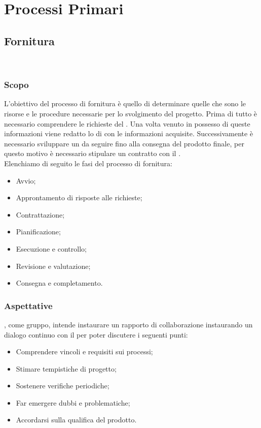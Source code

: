 \section{Processi Primari}
\subsection{Fornitura}\
\subsubsection{Scopo}
L'obiettivo del processo di fornitura è quello di determinare quelle che sono le risorse e le procedure necessarie per lo svolgimento del progetto. 
Prima di tutto è necessario comprendere le richieste del \proponProg{}. Una volta venuto in possesso di queste informazioni viene redatto lo  di \SdFv{} con le informazioni acquisite.
Successivamente è necessario sviluppare un \PdPv{} da seguire fino alla consegna del prodotto finale, per questo motivo è necessario stipulare un contratto con il \proponProg{}.\\
Elenchiamo di seguito le fasi del processo di fornitura:
\begin{itemize}
    \item{Avvio;}
    \item{Approntamento di risposte alle richieste;}
    \item{Contrattazione;}
    \item{Pianificazione;}
    \item{Esecuzione e controllo;}
    \item{Revisione e valutazione;}
    \item{Consegna e completamento.}
\end{itemize}

\subsubsection{Aspettative}
\Omicron, come gruppo, intende instaurare un rapporto di collaborazione instaurando un dialogo continuo con il \proponProg{} per poter discutere i seguenti punti:\\
\begin{itemize}
    \item{Comprendere vincoli e requisiti sui processi;}
    \item{Stimare tempistiche di progetto;}
    \item{Sostenere verifiche periodiche;}
    \item{Far emergere dubbi e problematiche;}
    \item{Accordarsi sulla qualifica del prodotto.}
\end{itemize}

